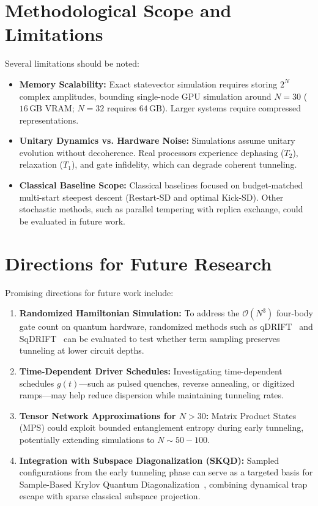 \documentclass[12pt,a4paper]{report}
\begin{document}
\section{Methodological Scope and Limitations}
\label{sec:limitations}
Several limitations should be noted:
\begin{itemize}
    \item \textbf{Memory Scalability:} Exact statevector simulation requires storing $2^N$ complex amplitudes, bounding single-node GPU simulation around $N = 30$ ($16\,\text{GB}$ VRAM; $N = 32$ requires $64\,\text{GB}$). Larger systems require compressed representations.
    \item \textbf{Unitary Dynamics vs. Hardware Noise:} Simulations assume unitary evolution without decoherence. Real processors experience dephasing ($T_2$), relaxation ($T_1$), and gate infidelity, which can degrade coherent tunneling.
    \item \textbf{Classical Baseline Scope:} Classical baselines focused on budget-matched multi-start steepest descent (Restart-SD and optimal Kick-SD). Other stochastic methods, such as parallel tempering with replica exchange, could be evaluated in future work.
\end{itemize}

\section{Directions for Future Research}
\label{sec:future_work}
Promising directions for future work include:
\begin{enumerate}
    \item \textbf{Randomized Hamiltonian Simulation:} To address the $\mathcal{O}(N^3)$ four-body gate count on quantum hardware, randomized methods such as qDRIFT~\cite{campbell2019} and SqDRIFT~\cite{piccinelli2025} can be evaluated to test whether term sampling preserves tunneling at lower circuit depths.
    \item \textbf{Time-Dependent Driver Schedules:} Investigating time-dependent schedules $g(t)$---such as pulsed quenches, reverse annealing, or digitized ramps---may help reduce dispersion while maintaining tunneling rates.
    \item \textbf{Tensor Network Approximations for $N > 30$:} Matrix Product States (MPS) could exploit bounded entanglement entropy during early tunneling, potentially extending simulations to $N \sim 50 - 100$.
    \item \textbf{Integration with Subspace Diagonalization (SKQD):} Sampled configurations from the early tunneling phase can serve as a targeted basis for Sample-Based Krylov Quantum Diagonalization~\cite{yu2025}, combining dynamical trap escape with sparse classical subspace projection.
\end{enumerate}
\end{document}
